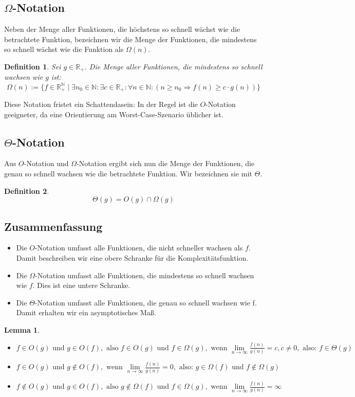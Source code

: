 \documentclass[11pt,a4paper]{scrartcl}
\newtheorem{definition}{Definition}
\newtheorem{lemma}{Lemma}
\begin{document}
\subsection{$\Omega$-Notation}
Neben der Menge aller Funktionen, die höchstens so schnell wächst wie die betrachtete Funktion, bezeichnen wir die Menge der Funktionen, die mindestens so schnell wächst wie die Funktion als $\Omega(n)$.
\begin{definition} Sei $g \in \mathbb{R_{+}}$. Die Menge aller Funktionen, die mindestens so schnell wachsen wie $g$ ist: 
\[\Omega(n) := \{ f \in \mathbb{R_{+}^{\mathbb{N}}} \mid \exists n_{0} \in \mathbb{N}: \exists c \in \mathbb{R_{+}}: \forall n \in \mathbb{N}: (n \geq n_{0} \Rightarrow f(n) \geq c \cdot g(n))\}\]
\end{definition}
Diese Notation fristet ein Schattendasein: In der Regel ist die $O$-Notation geeigneter, da eine Orientierung am {\glqq}Worst-Case-Szenario{\grqq} üblicher ist.
\subsection{$\Theta$-Notation}
Aus $O$-Notation und $\Omega$-Notation ergibt sich nun die Menge der Funktionen, die genau so schnell wachsen wie die betrachtete Funktion. Wir bezeichnen sie mit $\Theta$.
\begin{definition}
\[\Theta(g) = O(g) \cap \Omega(g)\]
\end{definition}
\subsection{Zusammenfassung}
\begin{itemize}
\item Die $O$-Notation umfasst alle Funktionen, die nicht schneller wachsen als $f$. Damit beschreiben wir eine obere Schranke für die Komplexitätsfunktion.
\item Die $\Omega$-Notation umfasst alle Funktionen, die mindestens so schnell wachsen wie $f$. Dies ist eine untere Schranke.
\item Die $\Theta$-Notation umfasst alle Funktionen, die genau so schnell wachsen wie f. Damit erhalten wir ein asymptotisches Maß.  
\end{itemize}
\begin{lemma}
\begin{itemize}
\item $f \in O(g) \text{ und } g \in O(f), \text{ also } f \in O(g) \text{ und } f \in \Omega (g), \text{ wenn } \lim \limits_{n \to \infty} \frac{f(n)}{g(n)} = c, c \neq 0, \text{ also: } f \in \Theta (g)$
\item $f \in O(g) \text{ und } g \notin O(f), \text{ wenn } \lim \limits_{n \to \infty} \frac{f(n)}{g(n)} = 0, \text{ also: } g \in \Omega (f) \text{ und } f \notin \Omega (g)$
\item $ f \notin O(g) \text{ und } g \in O(f), \text{ also } g \notin \Omega (f) \text{ und } f \in \Omega (g), \text{ wenn } \lim \limits_{n \to \infty} \frac{f(n)}{g(n)} = \infty$
\end{itemize}
\end{lemma}
\end{document}
